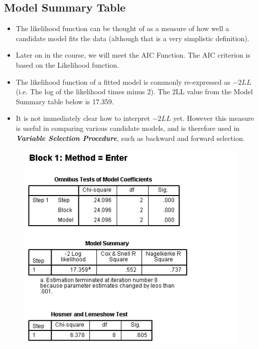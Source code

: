 \documentclass[a4paper,12pt]{article}
\begin{document}
\subsection{Model Summary Table}

\begin{itemize}
	\item The likelihood function can be thought of as a measure of how well a candidate model fits the data (although that is a very simplistic definition). 
	\item Later on in the course, we will meet the AIC Function. The AIC criterion is based on the Likelihood function.
	\item The likelihood function of a fitted model is commonly re-expressed as $-2LL$ (i.e. The log of the likelihood times minus 2). The 2LL value from the Model Summary table below is 17.359.
	\item It is not immediately clear how to interpret $-2LL$ yet. However this measure is useful in comparing various candidate models, and is therefore used in \textbf{\textit{Variable Selection Procedure}}, such as backward and forward selection.
\end{itemize}

\begin{figure}[h!]
\centering
\includegraphics[width=0.9\linewidth]{images/Logistic5}
\end{figure}





\newpage
\end{document}
